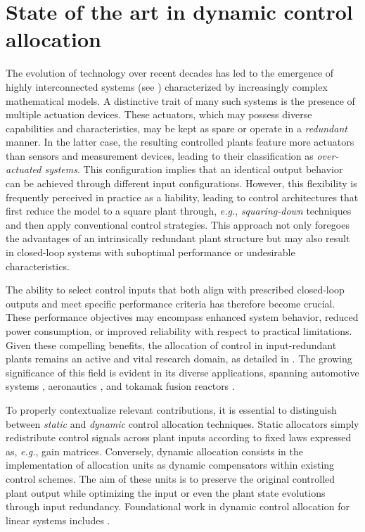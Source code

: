 \section{State of the art in dynamic control allocation}
\label{sec:sota_allocation}
The evolution of technology over recent decades has led to the emergence of highly interconnected systems (see ) characterized by increasingly complex mathematical models. A distinctive trait of many such systems is the presence of multiple actuation devices. These actuators, which may possess diverse capabilities and characteristics, may be kept as spare or operate in a \emph{redundant} manner. In the latter case, the resulting controlled plants feature more actuators than sensors and measurement devices, leading to their classification as \emph{over-actuated systems}. This configuration implies that an identical output behavior can be achieved through different input configurations. However, this flexibility is frequently perceived in practice as a liability, leading to control architectures that first reduce the model to a square plant through, \emph{e.g.}, \emph{squaring-down} techniques and then apply conventional control strategies. This approach not only foregoes the advantages of an intrinsically redundant plant structure but may also result in closed-loop systems with suboptimal performance or undesirable characteristics.

The ability to select control inputs that both align with prescribed closed-loop outputs and meet specific performance criteria has therefore become crucial. These performance objectives may encompass enhanced system behavior, reduced power consumption, or improved reliability with respect to practical limitations. Given these compelling benefits, the allocation of control in input-redundant plants remains an active and vital research domain, as detailed in \cite{johansen_control_2013,bodson_evaluation_2002,harkegard_resolving_2005}. The growing significance of this field is evident in its diverse applications, spanning automotive systems \cite{cordiner_dynamic_2010}, aeronautics \cite{sigthorsson_tracking_2006}, and tokamak fusion reactors \cite{de_tommasi_nonlinear_2011,de_tommasi_trading_2009,di_grazia_current_2023,tenaglia_dynamic_2024}.

To properly contextualize relevant contributions, it is essential to distinguish between \emph{static} and \emph{dynamic} control allocation techniques. Static allocators simply redistribute control signals across plant inputs according to fixed laws expressed as, \emph{e.g.}, gain matrices. Conversely, dynamic allocation consists in the implementation of allocation units as dynamic compensators within existing control schemes. The aim of these units is to preserve the original controlled plant output while optimizing the input or even the plant state evolutions through input redundancy. Foundational work in dynamic control allocation for linear systems includes \cite{zaccarian_dynamic_2009,serrani_output_2012,cocetti_dynamic_2016,cocetti_linear_2018}.

